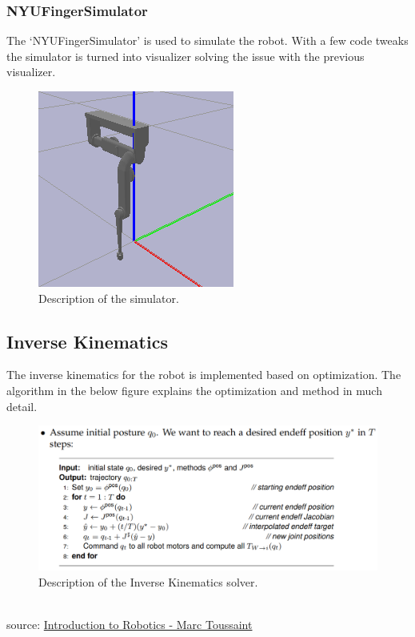 \documentclass[12pt]{article}
\begin{document}
        \subsubsection{NYUFingerSimulator}
            The `NYUFingerSimulator' is used to simulate the robot. With a few code tweaks the simulator is turned into visualizer 
            solving the issue with the previous visualizer.
            \begin{figure}[h]
                \centering
                \includegraphics[scale=0.6]{simulator.png}
                \caption{Description of the simulator.}
            \end{figure}

        \subsection{Inverse Kinematics}
            The inverse kinematics for the robot is implemented based on optimization. The algorithm in the below figure 
            explains the optimization and method in much detail.
            \begin{figure}[h]
                \centering
                \includegraphics[scale=0.35]{IK.png}
                \caption{Description of the Inverse Kinematics solver.}
            \end{figure}\\
            source: \href{https://www.user.tu-berlin.de/mtoussai//teaching/Lecture-Robotics.pdf}{Introduction to Robotics - Marc Toussaint}
        
\end{document}
